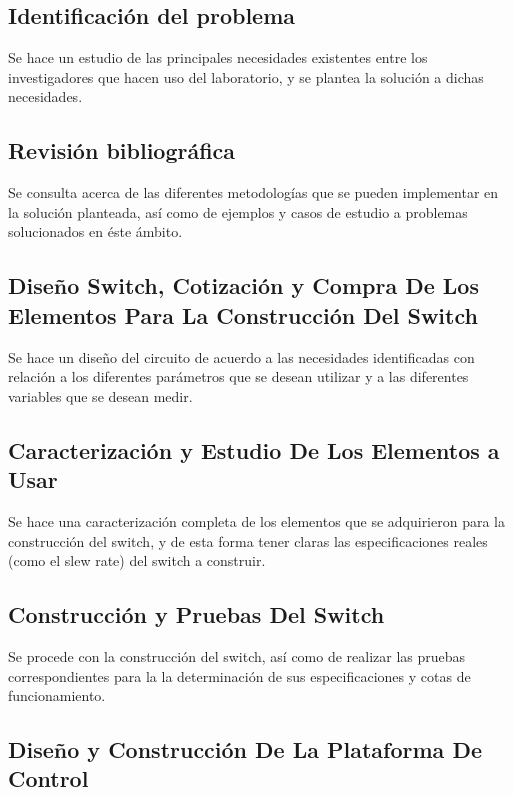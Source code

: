 \subsection{Identificación del problema}

Se hace un estudio de las principales necesidades existentes entre los investigadores que hacen uso del laboratorio, y se plantea la solución a dichas necesidades.  
\subsection{Revisión bibliográfica}

Se consulta acerca de las diferentes metodologías que se pueden implementar en la solución planteada, así como de ejemplos y casos de estudio a problemas solucionados en éste ámbito. 

\subsection{Diseño Switch, Cotización y Compra De Los Elementos Para La Construcción Del Switch}

Se hace un diseño del circuito de acuerdo a las necesidades identificadas con relación a los diferentes parámetros que se desean utilizar y a las diferentes variables que se desean medir. 

\subsection{Caracterización y Estudio De Los Elementos a Usar}

Se hace una caracterización completa de los elementos que se adquirieron para la construcción del switch, y de esta forma tener claras las especificaciones reales (como el slew rate) del switch a construir. 

\subsection{Construcción y Pruebas Del Switch}

Se procede con la construcción del switch, así como de realizar las pruebas correspondientes para la la determinación de sus especificaciones y cotas de funcionamiento.

\subsection{Diseño y Construcción De La Plataforma De Control}

